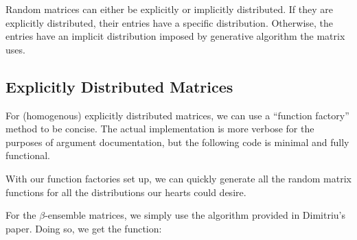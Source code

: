 Random matrices can either be explicitly or implicitly distributed. If they are explicitly distributed, their entries have a specific distribution. Otherwise, the entries have an implicit distribution imposed by generative algorithm the matrix uses.

\subsection{Explicitly Distributed Matrices}

For (homogenous) explicitly distributed matrices, we can use a ``function factory'' method to be concise. The actual implementation is more verbose for the purposes of argument documentation, but the following code is minimal and fully functional. %


\trimm
With our function factories set up, we can quickly generate all the random matrix functions for all the distributions our hearts could desire.

\trimm
\newpage

For the $\beta$-ensemble matrices, we simply use the algorithm provided in Dimitriu's paper. Doing so, we get the function:
\trimmm

